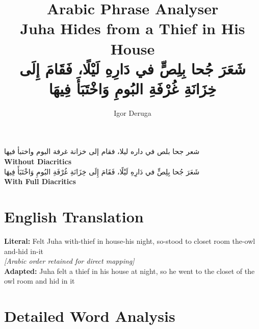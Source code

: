 \documentclass[letter,12pt]{article}
\begin{document}
\title{\textbf{\Large Arabic Phrase Analyser}\\
\large Juha Hides from a Thief in His House\\
\normalsize \textarabic{شَعَرَ جُحا بِلِصٍّ في دَارِهِ لَيْلًا، فَقَامَ إِلَى خِزَانَةِ غُرْفَةِ البُومِ وَاخْتَبَأَ فِيهَا}}
\author{Igor Deruga}
\date{}
\maketitle

\begin{tcolorbox}[colback=boxcolor,colframe=headercolor,title=\textbf{Arabic Phrase}]
\centering
\textarabic{شعر جحا بلص في داره ليلا، فقام إلى خزانة غرفة البوم واختبأ فيها}
\\[0.5em]
\textbf{Without Diacritics}
\\[1em]
\textarabic{شَعَرَ جُحا بِلِصٍّ في دَارِهِ لَيْلًا، فَقَامَ إِلَى خِزَانَةِ غُرْفَةِ البُومِ وَاخْتَبَأَ فِيهَا}
\\[0.5em]
\textbf{With Full Diacritics}
\end{tcolorbox}

\section{English Translation}
\begin{tcolorbox}[colback=white,colframe=accentcolor]
\textbf{Literal:} Felt Juha with-thief in house-his night, so-stood to closet room the-owl and-hid in-it \\
\textit{[Arabic order retained for direct mapping]}\\[0.5em]
\textbf{Adapted:} Juha felt a thief in his house at night, so he went to the closet of the owl room and hid in it
\end{tcolorbox}

\section{Detailed Word Analysis}
\end{document}
